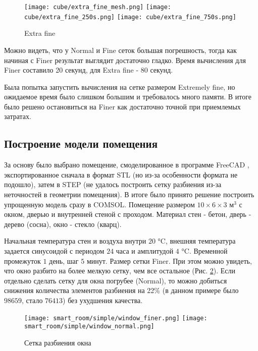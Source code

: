 \begin{figure}[H]
\texttt{[image: cube/extra\_fine\_mesh.png]}\hfill
\texttt{[image: cube/extra\_fine\_250s.png]}\hfill
\texttt{[image: cube/extra\_fine\_750s.png]}\hfill
\caption{Extra fine}
\label{cube-extra-fine}
\end{figure}

Можно видеть, что у Normal и Fine сеток большая погрешность, тогда как начиная с Finer результат выглядит достаточно гладко. Время вычисления для Finer составило 20 секунд, для Extra fine - 80 секунд.\par
Была попытка запустить вычисления на сетке размером Extremely fine, но ожидаемое время было слишком большим и требовалось много памяти. В итоге было решено остановиться на Finer как достаточно точной при приемлемых затратах.

\newpage


\subsection{Построение модели помещения}

За основу было выбрано помещение, смоделированное в программе FreeCAD \cite{freecad}, экспортированное сначала в формат STL \cite{stl} (но из-за особенности формата не подошло), затем в STEP \cite{step} (не удалось построить сетку разбиения из-за неточностей в геометрии помещения). В итоге было принято решение построить упрощенную модель сразу в COMSOL. Помещение размером $10 \times 6 \times 3 \text{ м}^3$ с окном, дверью и внутренней стеной с проходом. Материал стен - бетон, дверь - дерево (сосна), окно - стекло (кварц).

Начальная температура стен и воздуха внутри $20$ °C, внешняя температура задается синусоидой с периодом $24$ часа и амплитудой $4$ °C.
Временной промежуток $1$ день, шаг $5$ минут. Размер сетки Finer. При этом можно увидеть, что окно разбито на более мелкую сетку, чем все остальное (Рис. \ref{window}). Если отдельно сделать сетку для окна погрубее (Normal), то можно добиться снижения количества элементов разбиения на 22\% (в данном примере было $98659$, стало $76413$) без ухудшения качества.

\begin{figure}[H]
\texttt{[image: smart\_room/simple/window\_finer.png]}\hfill
\texttt{[image: smart\_room/simple/window\_normal.png]}
\caption{Сетка разбиения окна}
\label{window}
\end{figure}


